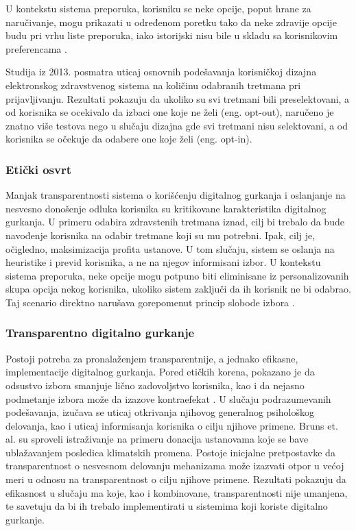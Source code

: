 \documentclass[a4paper]{article}
\begin{document}
U kontekstu sistema preporuka, korisniku se neke opcije, poput hrane za naručivanje, mogu prikazati u određenom poretku tako da neke zdravije opcije budu pri vrhu liste preporuka, iako istorijski nisu bile u skladu sa korisnikovim preferencama \cite{Jesse_Jannach_2021}.

Studija iz 2013. \cite{Probst_Shaffer_Chan_2013} posmatra uticaj osnovnih podešavanja korisničkoj dizajna elektronskog zdravstvenog sistema na količinu odabranih tretmana pri prijavljivanju. Rezultati pokazuju da ukoliko su svi tretmani bili preselektovani, a od korisnika se ocekivalo da izbaci one koje ne želi (eng. opt-out), naručeno je znatno više testova nego u slučaju dizajna gde svi tretmani nisu selektovani, a od korisnika se očekuje da odabere one koje želi (eng. opt-in).

\subsubsection{Etički osvrt}
Manjak transparentnosti sistema o korišćenju digitalnog gurkanja i oslanjanje na nesvesno donošenje odluka korisnika \cite{Bruns_Kantorowicz_2018} su kritikovane karakteristika digitalnog gurkanja. U primeru odabira zdravstenih tretmana iznad, cilj bi trebalo da bude navođenje korisnika na odabir tretmane koji su mu potrebni. Ipak, cilj je, očigledno, maksimizacija profita ustanove. U tom slučaju, sistem se oslanja na heuristike i previd korisnika, a ne na njegov informisani izbor. U kontekstu sistema preporuka, neke opcije mogu potpuno biti eliminisane iz personalizovanih skupa opcija nekog korisnika, ukoliko sistem zaključi da ih korisnik ne bi odabrao. Taj scenario direktno narušava gorepomenut princip slobode izbora \cite{Jesse_Jannach_2021}.

\subsubsection{Transparentno digitalno gurkanje}
Postoji potreba za pronalaženjem transparentnije, a jednako efikasne, implementacije digitalnog gurkanja. Pored etičkih korena, pokazano je da odsustvo izbora smanjuje lično zadovoljstvo korisnika, kao i da nejasno podmetanje izbora može da izazove kontraefekat \cite{Bruns_Kantorowicz_2018}. U slučaju podrazumevanih podešavanja, izučava se uticaj otkrivanja njihovog generalnog psihološkog delovanja, kao i uticaj informisanja korisnika o cilju njihove primene. Bruns et. al. \cite{Bruns_Kantorowicz_2018} su sproveli istraživanje na primeru donacija ustanovama koje se bave ublažavanjem posledica klimatskih promena.
Postoje inicjalne pretpostavke da transparentnost o nesvesnom delovanju mehanizama može izazvati otpor u većoj meri u odnosu na transparentnost o cilju njihove primene. Rezultati pokazuju da efikasnost u slučaju ma koje, kao i kombinovane, transparentnosti nije umanjena, te savetuju da bi ih trebalo implementirati u sistemima koji koriste digitalno gurkanje.
\end{document}
